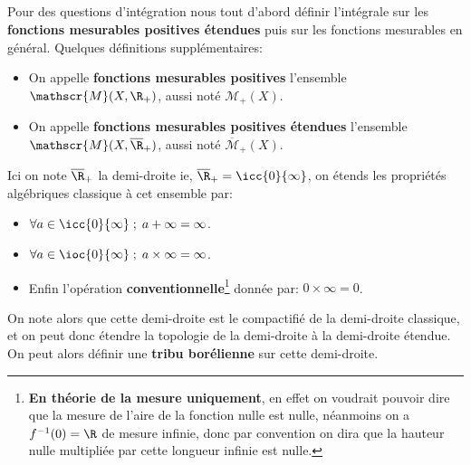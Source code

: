 \subsection*{}
Pour des questions d'intégration nous tout d'abord définir l'intégrale sur les \textbf{fonctions mesurables positives étendues} puis sur les fonctions mesurables en général. Quelques définitions supplémentaires:
\begin{itemize}
   \item On appelle \textbf{fonctions mesurables positives} l'ensemble \(\mathscr{M}(X, \R_+)\), aussi noté \(\mathscr{M}_+(X)\).
   \item On appelle  \textbf{fonctions mesurables positives étendues} l'ensemble \(\mathscr{M}(X, \overline{\R}_+)\), aussi noté \(\overline{\mathscr{M}}_+(X)\).
\end{itemize}
Ici on note \(\overline{\R}_+\) la demi-droite ie, \(\overline{\R}_+ = \icc{0}{\infty}\), on étends les propriétés algébriques classique à cet ensemble par:
\begin{itemize}
   \item \(\forall a \in \icc{0}{\infty} \; ; \; a + \infty = \infty\).
   \item \(\forall a \in \ioc{0}{\infty} \; ; \; a \times \infty = \infty\).
   \item Enfin l'opération \textbf{conventionnelle}\footnote[2]{\textbf{En théorie de la mesure uniquement}, en effet on voudrait pouvoir dire que la mesure de l'aire de la fonction nulle est nulle, néanmoins on a \(f^{-1}(0) = \R\) de mesure infinie, donc par convention on dira que la hauteur nulle multipliée par cette longueur infinie est nulle.} donnée par:  \(0 \times \infty = 0\).
\end{itemize}
On note alors que cette demi-droite est le compactifié de la demi-droite classique, et on peut donc étendre la topologie de la demi-droite à la demi-droite étendue. On peut alors définir une \textbf{tribu borélienne} sur cette demi-droite.

